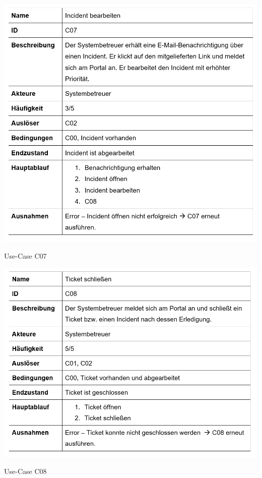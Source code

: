 \begin{table}[h]
	\centering
	\includegraphics[scale=0.62]{figures/C07.png}
	\caption{Use-Case C07}
	\label{Abb_C07}
\end{table}

\vspace{-.5cm}	
\begin{table}[h]
	\centering
	\includegraphics[scale=0.62]{figures/C08.png}
	\caption{Use-Case C08}
	\label{Abb_C08}
\end{table}


